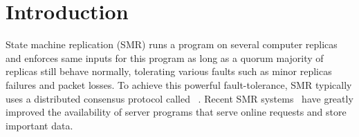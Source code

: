 \section{Introduction} \label{sec:intro}


State machine replication (SMR) runs a program on several computer 
replicas and enforces same inputs for this program as long as a quorum 
majority of replicas still behave normally, tolerating various 
faults such as minor replicas failures and packet losses. To achieve 
this powerful 
fault-tolerance, SMR typically uses 
a distributed consensus protocol called 
\paxos~\cite{paxos:practical,paxos,paxos:simple,paxos:complex}. Recent SMR 
systems~\cite{eve:osdi12,rex:eurosys14,crane:sosp15} have greatly 
improved the availability of server programs that serve online requests and 
store important data.










